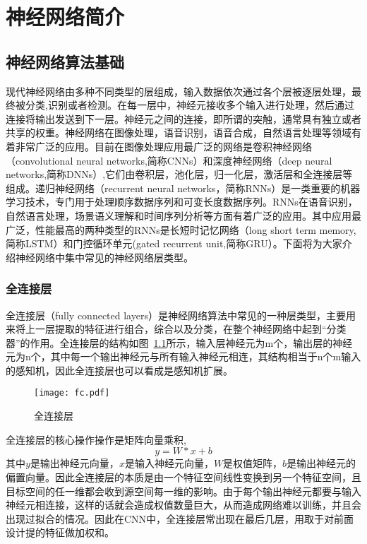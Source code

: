 \chapter{神经网络简介}


\section{神经网络算法基础}
现代神经网络由多种不同类型的层组成，输入数据依次通过各个层被逐层处理，最终被分类,识别或者检测。在每一层中，神经元接收多个输入进行处理，然后通过连接将输出发送到下一层。神经元之间的连接，即所谓的突触，通常具有独立或者共享的权重。神经网络在图像处理，语音识别，语音合成，自然语言处理等领域有着非常广泛的应用。目前在图像处理应用最广泛的网络是卷积神经网络（convolutional neural networks,简称CNNs）和深度神经网络（deep neural networks,简称DNNs）,它们由卷积层，池化层，归一化层，激活层和全连接层等组成。递归神经网络（recurrent neural networks，简称RNNs）是一类重要的机器学习技术，专门用于处理顺序数据序列和可变长度数据序列。RNNs在语音识别，自然语言处理，场景语义理解和时间序列分析等方面有着广泛的应用。其中应用最广泛，性能最高的两种类型的RNNs是长短时记忆网络（long short term memory,简称LSTM）和门控循环单元(gated recurrent unit,简称GRU）。下面将为大家介绍神经网络中集中常见的神经网络层类型。

\subsection{全连接层}
全连接层（fully connected layers）是神经网络算法中常见的一种层类型，主要用来将上一层提取的特征进行组合，综合以及分类，在整个神经网络中起到“分类器”的作用。全连接层的结构如图~\ref{fig:fc_layer}所示，输入层神经元为m个，输出层的神经元为n个，其中每一个输出神经元与所有输入神经元相连，其结构相当于n个m输入的感知机，因此全连接层也可以看成是感知机扩展。 
\begin{figure}
  \centering
  \texttt{[image: fc.pdf]}
  \caption{\footnotesize 全连接层}
  \label{fig:fc_layer}
\end{figure}


全连接层的核心操作操作是矩阵向量乘积,
\begin{equation}
y=W*x+b
\end{equation}
其中$y$是输出神经元向量，$x$是输入神经元向量，$W$是权值矩阵，$b$是输出神经元的偏置向量。因此全连接层的本质是由一个特征空间线性变换到另一个特征空间，且目标空间的任一维都会收到源空间每一维的影响。由于每个输出神经元都要与输入神经元相连接，这样的话就会造成权值数量巨大，从而造成网络难以训练，并且会出现过拟合的情况。因此在CNN中，全连接层常出现在最后几层，用取于对前面设计提的特征做加权和。

